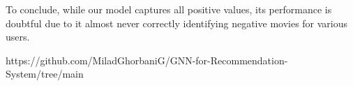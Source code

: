 \documentclass[]{article}
\begin{document}
	To conclude, while our model captures all positive values, its performance is doubtful due to it almost never correctly identifying negative movies for various users.
	
	\begin{thebibliography}{99}
		 https://github.com/MiladGhorbaniG/GNN-for-Recommendation-System/tree/main
	\end{thebibliography}
	
\end{document}
